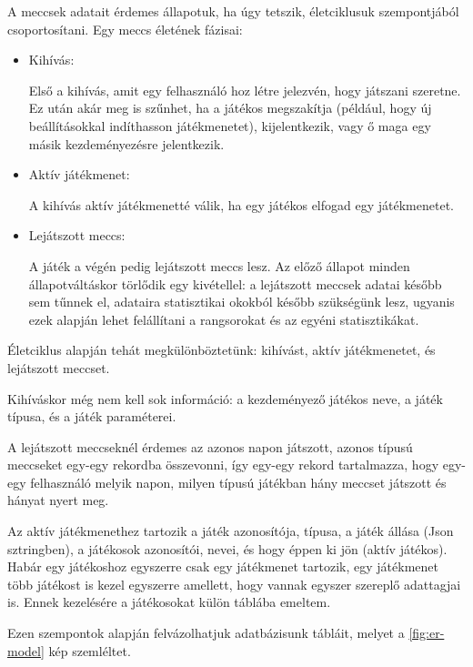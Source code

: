 A meccsek adatait érdemes állapotuk, ha úgy tetszik, életciklusuk szempontjából csoportosítani. Egy meccs életének fázisai:
\begin{itemize}
	\item Kihívás:
	
	Első a kihívás, amit egy felhasználó hoz létre jelezvén, hogy játszani szeretne.
	Ez után akár meg is szűnhet, ha a játékos megszakítja (például, hogy új beállításokkal indíthasson játékmenetet), kijelentkezik, vagy ő maga egy másik kezdeményezésre jelentkezik.
	\item Aktív játékmenet:
	
	A kihívás aktív játékmenetté válik, ha egy játékos elfogad egy játékmenetet.
	\item Lejátszott meccs:
	
	A játék a végén pedig lejátszott meccs lesz. Az előző állapot minden állapotváltáskor törlődik egy kivétellel: a lejátszott meccsek adatai később sem tűnnek el, adataira statisztikai okokból később szükségünk lesz, ugyanis ezek alapján lehet felállítani a rangsorokat és az egyéni statisztikákat.
\end{itemize}
Életciklus alapján tehát megkülönböztetünk: kihívást, aktív játékmenetet, és lejátszott meccset.

Kihíváskor még nem kell sok információ: a kezdeményező játékos neve, a játék típusa, és a játék paraméterei.

A lejátszott meccseknél érdemes az azonos napon játszott, azonos típusú meccseket egy-egy rekordba összevonni, így egy-egy rekord tartalmazza, hogy egy-egy felhasználó melyik napon, milyen típusú játékban hány meccset játszott és hányat nyert meg.

Az aktív játékmenethez tartozik a játék azonosítója, típusa, a játék állása (Json sztringben), a játékosok azonosítói, nevei, és hogy éppen ki jön (aktív játékos). Habár egy játékoshoz egyszerre csak egy játékmenet tartozik, egy játékmenet több játékost is kezel egyszerre amellett, hogy vannak egyszer szereplő adattagjai is. Ennek kezelésére a játékosokat külön táblába emeltem.

Ezen szempontok alapján felvázolhatjuk adatbázisunk tábláit, melyet a \ref{fig:er-model} kép szemléltet.

